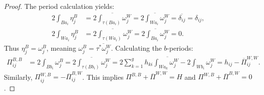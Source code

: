\documentclass[10pt,a4paper]{amsart}
\begin{document}
\begin{proof}
	The period calculation yields:
	\begin{align*}
		2\int_{Ba_i} \eta_j^B &= \overline{2\int_{\tau(Ba_i)} \omega_j^W} = \overline{2\int_{Wa_i} \omega_j^W} = \overline{\delta_{ij}} = \delta_{ij},\\
		2\int_{Wa_i} \eta_j^B &= \overline{2\int_{\tau(Wa_i)} \omega_j^W} = \overline{2\int_{Ba_i} \omega_j^W} = 0.
	\end{align*}
	Thus $\eta_j^B = \omega_j^B$, meaning $\omega_j^B = \overline{\tau^* \omega_j^W}$.
	Calculating the $b$-periods:
	\begin{align*}
		\Pi_{ij}^{B,B} &= 2 \int_{Bb_i} \omega_j^B = \overline{2 \int_{\tau(Bb_i)} \omega_j^W}
		= \overline{2 \sum_{k=1}^{g} h_{ki}\int_{Wa_k}\omega_j^W - 2 \int_{Wb_i} \omega_j^W}
		= h_{ij} - \overline{\Pi}_{ij}^{W,W}.
	\end{align*}
	Similarly, $\Pi_{ij}^{W,B} = -\overline{\Pi}_{ij}^{B,W}$.
	This implies $\Pi^{B,B} + \overline{\Pi}^{W,W} = H$ and $\Pi^{W,B} + \overline{\Pi}^{B,W} = 0$.
\end{proof}
\end{document}
